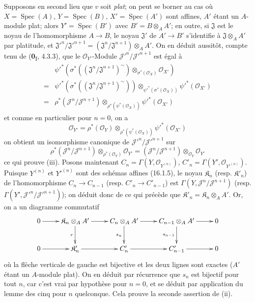 Supposons en second lieu que $v$ soit \emph{plat}; on peut se borner au cas où
$X=\operatorname{Spec}(A)$, $Y=\operatorname{Spec}(B)$,
$X'=\operatorname{Spec}(A')$ sont affines, $A'$ étant un $A$-module plat;
alors $Y'=\operatorname{Spec}(B')$ avec $B'=B\otimes_A A'$; en outre, si
$\mathfrak{J}$ est le noyau de l'homomorphisme $A\to B$, le noyau
$\mathfrak{J}'$ de $A'\to B'$ s'identifie à $\mathfrak{J}\otimes_A A'$ par
platitude, et
$\mathfrak{J}'^n/\mathfrak{J}'^{n+1}=(\mathfrak{J}^n/\mathfrak{J}^{n+1})\otimes_A A'$. On en déduit aussitôt, compte tenu de (\textbf{0}\textsubscript{I}, 4.3.3), que le
$\mathcal{O}_{Y'}$-Module
$\mathscr{J}'^n/\mathscr{J}'^{n+1}$ est égal à
\begin{align*}
&\psi'^*\!\left(\sigma^*
  \left((\mathfrak{J}^n/\mathfrak{J}^{n+1})^{\sim}\right)
  \otimes_{\sigma^*(\mathcal{O}_X)}\mathcal{O}_{X'}\right) \\
={}&
\psi'^*\!\left(\sigma^*
  \left((\mathfrak{J}^n/\mathfrak{J}^{n+1})^{\sim}\right)\right)
  \otimes_{\psi'^*(\sigma^*(\mathcal{O}_X))}
  \psi'^*(\mathcal{O}_{X'}) \\
={}&
\rho^*(\mathscr{J}^n/\mathscr{J}^{n+1})
  \otimes_{\rho^*(\psi^*(\mathcal{O}_X))}
  \psi'^*(\mathcal{O}_{X'})
\end{align*}
et comme en particulier pour $n=0$, on a
\[
  \mathcal{O}_{Y'}=
  \rho^*(\mathcal{O}_Y)
  \otimes_{\rho^*(\psi^*(\mathcal{O}_X))}
  \psi'^*(\mathcal{O}_{X'})
\]
on obtient un isomorphisme canonique de
$\mathscr{J}'^n/\mathscr{J}'^{n+1}$ sur
\[
  \rho^*(\mathscr{J}^n/\mathscr{J}^{n+1})
  \otimes_{\rho^*(\mathcal{O}_Y)}\mathcal{O}_{Y'}
  =
  (\mathscr{J}^n/\mathscr{J}^{n+1})
  \otimes_{\mathcal{O}_Y}\mathcal{O}_{Y'}
\]
ce qui prouve (iii). Posons maintenant
$C_n=\Gamma(Y,\mathcal{O}_{Y^{(n)}})$,
$C'_n=\Gamma(Y',\mathcal{O}_{Y'^{(n)}})$. Puisque $Y^{(n)}$ et
$Y'^{(n)}$ sont des schémas affines (16.1.5), le noyau
$\mathfrak{K}_n$ (resp. $\mathfrak{K}'_n$) de l'homomorphisme
$C_n\to C_{n-1}$ (resp. $C'_n\to C'_{n-1}$) est
$\Gamma(Y,\mathscr{J}^n/\mathscr{J}^{n+1})$ (resp.
$\Gamma(Y',\mathscr{J}'^n/\mathscr{J}'^{n+1})$); on déduit donc de ce qui
précède que $\mathfrak{K}'_n=\mathfrak{K}_n\otimes_A A'$. Or, on a un
diagramme commutatif
\[
  \xymatrix{
    0 \ar[r] &
    \mathfrak{K}_n\otimes_A A' \ar[r]\ar[d]_r &
    C_n\otimes_A A' \ar[r]\ar[d]_{s_n} &
    C_{n-1}\otimes_A A' \ar[r]\ar[d]_{s_{n-1}} & 0 \\
    0 \ar[r] &
    \mathfrak{K}'_n \ar[r] &
    C'_n \ar[r] &
    C'_{n-1} \ar[r] & 0
  }
\]
où la flèche verticale de gauche est bijective et les deux lignes sont exactes
($A'$ étant un $A$-module plat). On en déduit par récurrence que $s_n$ est
bijectif pour tout $n$, car c'est vrai par hypothèse pour $n=0$, et se déduit
par application du lemme des cinq pour $n$ quelconque. Cela prouve la seconde
assertion de (ii).

